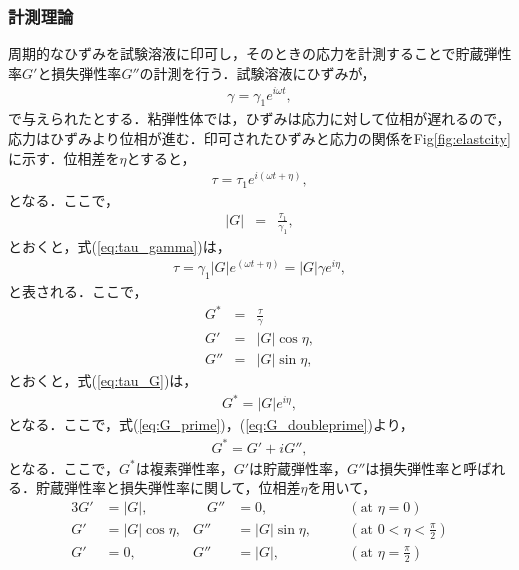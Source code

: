 \subsubsection{計測理論}
周期的なひずみを試験溶液に印可し，そのときの応力を計測することで貯蔵弾性率$G'$と損失弾性率$G''$の計測を行う．試験溶液にひずみが，
\begin{eqnarray}
    \gamma=\gamma_1e^{i\omega{}t} ,
\end{eqnarray}
で与えられたとする．粘弾性体では，ひずみは応力に対して位相が遅れるので，応力はひずみより位相が進む．印可されたひずみと応力の関係をFig\ref{fig:elastcity}に示す．位相差を$\eta$とすると，
\begin{eqnarray}
    \tau=\tau_1e^{i\left(\omega{}t+\eta\right)} ,
    \label{eq:tau_gamma}
\end{eqnarray}
となる．ここで，
\begin{eqnarray}
    |G| &=& \frac{\tau_1}{\gamma_1} ,
\end{eqnarray}
とおくと，式(\ref{eq:tau_gamma})は，
\begin{eqnarray}
    \tau=\gamma_1|G|e^{\left(\omega{}t+\eta\right)}=|G|\gamma{}e^{i\eta} ,
    \label{eq:tau_G}
\end{eqnarray}
と表される．ここで，
\begin{eqnarray}
    G^* &=& \frac{\tau}{\gamma}\\
    G' &=& |G|\cos\eta ,\label{eq:G_prime}\\
    G'' &=& |G|\sin\eta ,\label{eq:G_doubleprime}
\end{eqnarray}
とおくと，式(\ref{eq:tau_G})は，
\begin{eqnarray}
    G^* = |G|e^{i\eta} ,
    \label{eq:G_star}
\end{eqnarray}
となる．ここで，式(\ref{eq:G_prime})，(\ref{eq:G_doubleprime})より，
\begin{eqnarray}
    G^* = G'+iG'' ,
\end{eqnarray}
となる．ここで，$G^*$は複素弾性率，$G'$は貯蔵弾性率，$G''$は損失弾性率と呼ばれる\cite{生物レオロジー}\cite{化学者のためのレオロジー}．貯蔵弾性率と損失弾性率に関して，位相差$\eta$を用いて，
\begin{alignat}{3}
    G' & = |G| ,         & \quad G'' & = 0 ,           & \quad & \left(\text{at } \eta=0\right)               \label{eq:G_case1} \\
    G' & = |G|\cos\eta , & G''       & = |G|\sin\eta , &       & \left(\text{at } 0<\eta<\frac{\pi}{2}\right) \label{eq:G_case2} \\
    G' & = 0 ,           & G''       & = |G| ,         &       & \left(\text{at } \eta=\frac{\pi}{2}\right)   \label{eq:G_case3}
\end{alignat}
